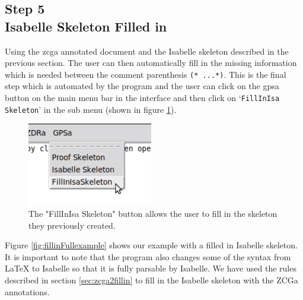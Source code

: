\subsection{Step 5\\Isabelle Skeleton Filled in}

Using the \gls{zcga} annotated document and the Isabelle skeleton described in
the previous section. The user can then automatically fill in the missing
information which is needed between the comment parenthesis \verb|(* ...*)|.
This is the final step which is automated by the program and the user can click
on the \gls{gpsa} button on the main menu bar in the interface and then click on
`\texttt{FillInIsa Skeleton}' in the sub menu (shown in figure
\ref{fig:fillinisa}).

\begin{figure}[H]
\centering
\includegraphics[scale=1]{Figures/fullexample/fillinisabutton.png}
\caption{The "FillInIsa Skeleton" button allows the user to fill in the skeleton they previously created. \label{fig:fillinisa}}
\end{figure}

Figure \ref{fig:fillinFullexample} shows our example with a filled in Isabelle
skeleton. It is important to note that the program also changes some of the
syntax from \LaTeX{} to Isabelle so that it is fully parsable by Isabelle.
We have used the rules described in section \ref{sec:zcga2fillin} to fill in the Isabelle
 skeleton with the ZCGa annotations.

